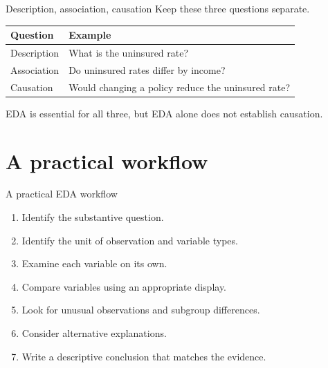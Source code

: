 \documentclass[11pt,aspectratio=169]{beamer}
\begin{document}
\begin{frame}{Description, association, causation}
Keep these three questions separate.

\vspace{0.5em}
\begin{center}
\renewcommand{\arraystretch}{1.35}
\begin{tabular}{p{}p{}}
\toprule
\textbf{Question} & \textbf{Example} \\
\midrule
Description & What is the uninsured rate? \\
Association & Do uninsured rates differ by income? \\
Causation & Would changing a policy reduce the uninsured rate? \\
\bottomrule
\end{tabular}
\end{center}

\vspace{0.6em}
EDA is essential for all three, but \alert{EDA alone does not establish causation}.
\end{frame}

\section{A practical workflow}

\begin{frame}{A practical EDA workflow}
\begin{enumerate}
  \item Identify the substantive question.
  \item Identify the unit of observation and variable types.
  \item Examine each variable on its own.
  \item Compare variables using an appropriate display.
  \item Look for unusual observations and subgroup differences.
  \item Consider alternative explanations.
  \item Write a descriptive conclusion that matches the evidence.
\end{enumerate}
\end{frame}
\end{document}
